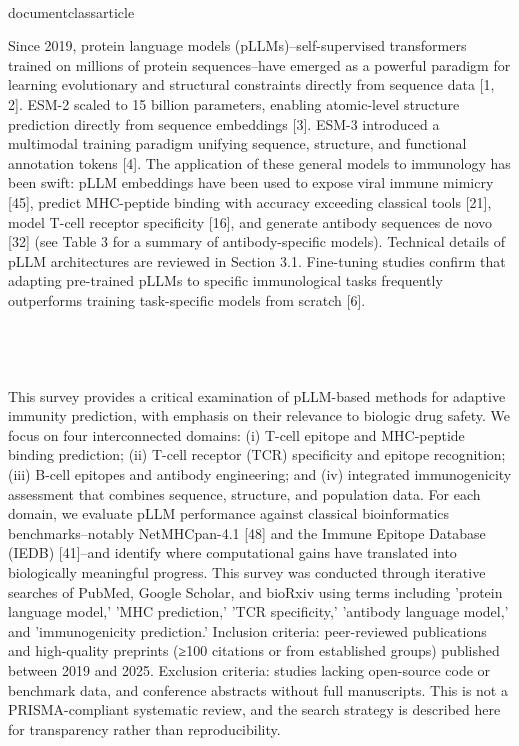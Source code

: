 \\documentclass{article}
\begin{document}
Since 2019, protein language models (pLLMs)--self-supervised transformers trained on millions of protein sequences--have emerged as a powerful paradigm for learning evolutionary and structural constraints directly from sequence data [1, 2]. ESM-2 scaled to 15 billion parameters, enabling atomic-level structure prediction directly from sequence embeddings [3]. ESM-3 introduced a multimodal training paradigm unifying sequence, structure, and functional annotation tokens [4]. The application of these general models to immunology has been swift: pLLM embeddings have been used to expose viral immune mimicry [45], predict MHC-peptide binding with accuracy exceeding classical tools [21], model T-cell receptor specificity [16], and generate antibody sequences de novo [32] (see Table 3 for a summary of antibody-specific models). Technical details of pLLM architectures are reviewed in Section 3.1. Fine-tuning studies confirm that adapting pre-trained pLLMs to specific immunological tasks frequently outperforms training task-specific models from scratch [6].

\subsection{}

This survey provides a critical examination of pLLM-based methods for adaptive immunity prediction, with emphasis on their relevance to biologic drug safety. We focus on four interconnected domains: (i) T-cell epitope and MHC-peptide binding prediction; (ii) T-cell receptor (TCR) specificity and epitope recognition; (iii) B-cell epitopes and antibody engineering; and (iv) integrated immunogenicity assessment that combines sequence, structure, and population data. For each domain, we evaluate pLLM performance against classical bioinformatics benchmarks--notably NetMHCpan-4.1 [48] and the Immune Epitope Database (IEDB) [41]--and identify where computational gains have translated into biologically meaningful progress. This survey was conducted through iterative searches of PubMed, Google Scholar, and bioRxiv using terms including 'protein language model,' 'MHC prediction,' 'TCR specificity,' 'antibody language model,' and 'immunogenicity prediction.' Inclusion criteria: peer-reviewed publications and high-quality preprints (≥100 citations or from established groups) published between 2019 and 2025. Exclusion criteria: studies lacking open-source code or benchmark data, and conference abstracts without full manuscripts. This is not a PRISMA-compliant systematic review, and the search strategy is described here for transparency rather than reproducibility.
\end{document}
